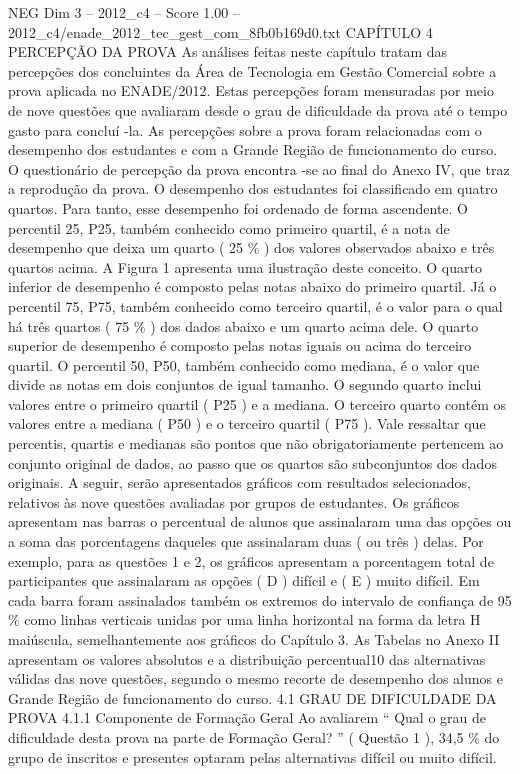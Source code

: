 \begin{textsample}{NEG Dim 3 – 2012\_c4 – Score 1.00 – 2012\_c4/enade\_2012\_tec\_gest\_com\_8fb0b169d0.txt}  \label{ex:f3_neg_126}
CAPÍTULO 4 PERCEPÇÃO DA PROVA As análises feitas neste capítulo tratam das percepções dos concluintes da Área de Tecnologia em Gestão Comercial sobre a prova aplicada no ENADE/2012.
Estas percepções foram mensuradas por meio de nove questões que avaliaram desde o grau de dificuldade da prova até o tempo gasto para concluí -la.
As percepções sobre a prova foram relacionadas com o desempenho dos estudantes e com a Grande Região de funcionamento do curso.
O questionário de percepção da prova encontra -se ao final do Anexo IV, que traz a reprodução da prova.
O desempenho dos estudantes foi classificado em quatro quartos.
Para tanto, esse desempenho foi ordenado de forma ascendente.
O percentil 25, P25, também conhecido como primeiro quartil, é a nota de desempenho que deixa um quarto ( 25 \% ) dos valores observados abaixo e três quartos acima.
A Figura 1 apresenta uma ilustração deste conceito.
O quarto inferior de desempenho é composto pelas notas abaixo do primeiro quartil.
Já o percentil 75, P75, também conhecido como terceiro quartil, é o valor para o qual há três quartos ( 75 \% ) dos dados abaixo e um quarto acima dele.
O quarto superior de desempenho é composto pelas notas iguais ou acima do terceiro quartil.
O percentil 50, P50, também conhecido como mediana, é o valor que divide as notas em dois conjuntos de igual tamanho.
O segundo quarto inclui valores entre o primeiro quartil ( P25 ) e a mediana.
O terceiro quarto contém os valores entre a mediana ( P50 ) e o terceiro quartil ( P75 ).
Vale ressaltar que percentis, quartis e medianas são pontos que não obrigatoriamente pertencem ao conjunto original de dados, ao passo que os quartos são subconjuntos dos dados originais.
A seguir, serão apresentados gráficos com resultados selecionados, relativos às nove questões avaliadas por grupos de estudantes.
Os gráficos apresentam nas barras o percentual de alunos que assinalaram uma das opções ou a soma das porcentagens daqueles que assinalaram duas ( ou três ) delas.
Por exemplo, para as questões 1 e 2, os gráficos apresentam a porcentagem total de participantes que assinalaram as opções ( D ) difícil e ( E ) muito difícil.
Em cada barra foram assinalados também os extremos do intervalo de confiança de 95 \% como linhas verticais unidas por uma linha horizontal na forma da letra H maiúscula, semelhantemente aos gráficos do Capítulo 3.
As Tabelas no Anexo II apresentam os valores absolutos e a distribuição percentual10 das alternativas válidas das nove questões, segundo o mesmo recorte de desempenho dos alunos e Grande Região de funcionamento do curso. 4.1 GRAU DE DIFICULDADE DA PROVA 4.1.1 Componente de Formação Geral Ao avaliarem “ Qual o grau de dificuldade desta prova na parte de Formação Geral? ” ( Questão 1 ), 34,5 \% do grupo de inscritos e presentes optaram pelas alternativas difícil ou muito difícil.

\end{textsample}
